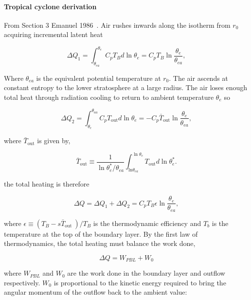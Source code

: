 \paragraph{Tropical cyclone derivation}

From Section 3 Emanuel 1986~\cite{emanuel1986air}.
Air rushes inwards along the isotherm from $r_{0}$ acquiring
incremental latent heat

\begin{equation}
\Delta Q_{1}=\int_{\theta_{e a}}^{\theta_{e}} C_{p} T_{B} d \ln \theta_{e}=C_{p} T_{B} \ln \frac{\theta_{e}}{\theta_{e a}},
\end{equation}

Where $\theta_{e a}$ is the equivalent potential temperature at
$r_{0}$. The air ascends at constant entropy to the lower stratosphere
at a large radius. The air loses enough total heat through radiation cooling
to return to ambient temperature $\theta_{e}$ so

\begin{equation}
\Delta Q_{2}=\int_{\theta_{e}}^{\theta_{a a}} C_{p} T_{\mathrm{out}} d \ln \theta_{e}=-C_{p} \bar{T}_{\mathrm{out}} \ln \frac{\theta_{e}}{\theta_{e a}},
\end{equation}

where $\bar{T}_{\mathrm{out}}$ is given by,

\begin{equation}
\bar{T}_{\mathrm{out}} \equiv \frac{1}{\ln \theta_{e}^{*} / \theta_{e a}} \int_{\mathrm{ln} \theta_{e a}}^{\ln \theta_{e}} T_{\mathrm{out}} d \ln \theta_{e}^{*}.
\end{equation}

the total heating is therefore

\begin{equation}
\Delta Q=\Delta Q_{1}+\Delta Q_{2}=C_{p} T_{B} \epsilon \ln \frac{\theta_{e}}{\theta_{e a}},
\end{equation}

where 
$
\epsilon \equiv\left(T_{B}-s\bar{T}_{\text {out }}\right) / T_{B}
$
is the thermodynamic efficiency and $T_b$ is the temperature at the top of the
boundary layer. By the first law of thermodynamics, the total heating
must balance the work done,

\begin{equation}
\Delta Q=W_{P B L}+W_{0}
\end{equation}

where $W_{PBL}$ and $W_0$ are the work done in the boundary layer and outflow
respectively. $W_0$ is proportional to the kinetic energy required to
bring the angular momentum of the outflow back to the ambient value:

